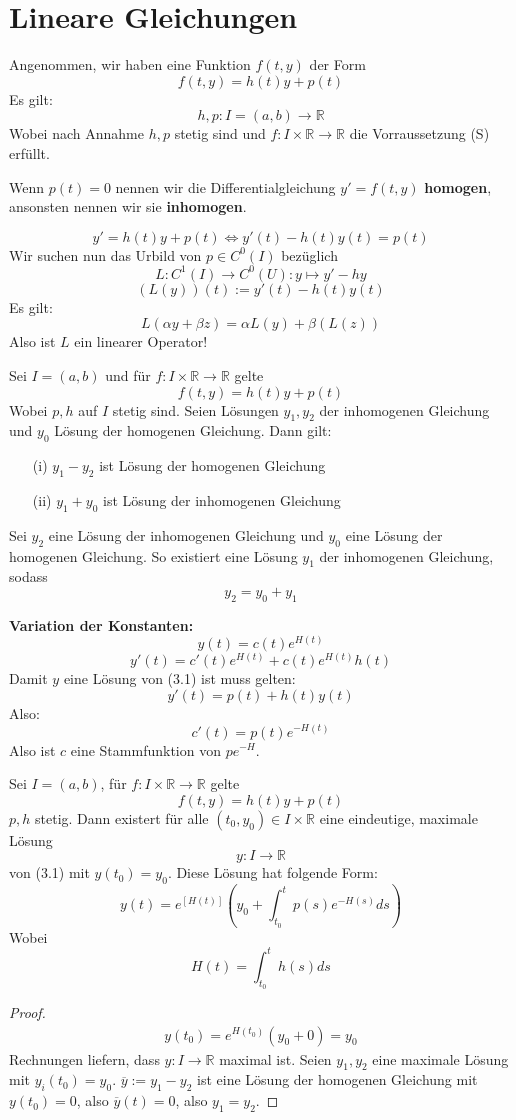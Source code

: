 \documentclass{report}
\newcommand*{\newpar}{\par\vspace{\baselineskip}\noindent}
\newcommand{\bR}{\mathbb{R}}
\begin{document}
\section{Lineare Gleichungen}
Angenommen, wir haben eine Funktion $f(t, y)$ der Form
\[f(t,y) = h(t)y + p(t)\]
Es gilt:
\[h, p : I = (a,b) \to \bR\]
Wobei nach Annahme $h, p$ stetig sind und $f : I \times \bR \to \bR$ die Vorraussetzung (S) erfüllt.
\newpar
Wenn $p(t) = 0$ nennen wir die Differentialgleichung $y' = f(t,y)$ \textbf{homogen}, ansonsten nennen wir sie \textbf{inhomogen}.
\newpar
\[y' = h(t)y + p(t) \Leftrightarrow y'(t) - h(t)y(t) = p(t)\]
Wir suchen nun das Urbild von $p \in C^0(I)$ bezüglich
\[L : C^1(I) \to C^0(U) : y \mapsto y' - hy\]
\[(L(y))(t) := y'(t) - h(t)y(t)\]
Es gilt:
\[L(\alpha y + \beta z) = \alpha L(y) + \beta(L(z))\]
Also ist $L$ ein linearer Operator!
\newpar
[...]
\clearpage
\begin{lemma}
	Sei $I = (a,b)$ und für $f : I \times \bR \to \bR$ gelte
	\[f(t,y) = h(t)y + p(t)\]
	Wobei $p, h$ auf $I$ stetig sind. Seien Lösungen $y_1, y_2$ der inhomogenen Gleichung und $y_0$ Lösung der homogenen Gleichung. Dann gilt:
	\begin{enumerate}
		\item[(i)] $y_1 - y_2$ ist Lösung der homogenen Gleichung
		\item[(ii)] $y_1 + y_0$ ist Lösung der inhomogenen Gleichung
	\end{enumerate}
\end{lemma}
\begin{lemma}
	Sei $y_2$ eine Lösung der inhomogenen Gleichung und $y_0$ eine Lösung der homogenen Gleichung. So existiert eine Lösung $y_1$ der inhomogenen Gleichung, sodass
	\[y_2 = y_0 + y_1\]
\end{lemma}
	\textbf{Variation der Konstanten:} 
	\[y(t) = c(t) e^{H(t)}\]
	\[y'(t) = c'(t) e^{H(t)} + c(t)e^{H(t)}h(t)\]
	Damit $y$ eine Lösung von (3.1) ist muss gelten:
	\[y'(t) = p(t) + h(t)y(t)\]
	Also:
	\[c'(t) = p(t)e^{-H(t)}\]
	Also ist $c$ eine Stammfunktion von $pe^{-H}$.
\begin{theorem}
	Sei $I = (a,b)$, für $f : I \times \bR \to \bR$ gelte
	\[f(t,y) = h(t)y + p(t)\]
	$p,h$ stetig. Dann existert für alle $(t_0, y_0) \in I \times \bR$ eine eindeutige, maximale Lösung
	\[y : I \to \bR\]
	von (3.1) mit $y(t_0) = y_0$. Diese Lösung hat folgende Form:
	\[y(t) = e^{[H(t)]}\left(y_0 + \int_{t_0}^t p(s) e^{-H(s)} ds\right)\]
	Wobei
	\[H(t) = \int_{t_0}^t h(s) ds\]
\end{theorem}
\begin{proof}
	\begin{align*}
		y(t_0) = e^{H(t_0)} (y_0 + 0) = y_0
	\end{align*}
	Rechnungen liefern, dass $y : I \to \bR$ maximal ist. Seien $y_1, y_2$ eine maximale Lösung mit $y_i(t_0) = y_0$. $\overline{y} := y_1 - y_2$ ist eine Lösung der homogenen Gleichung mit $y(t_0) = 0$, also $\overline{y}(t) = 0$, also $y_1 = y_2$.
\end{proof}
%
%
%
%
%
%
%
%
%
%
%
%
%
%
%
%
%
\clearpage
\end{document}
